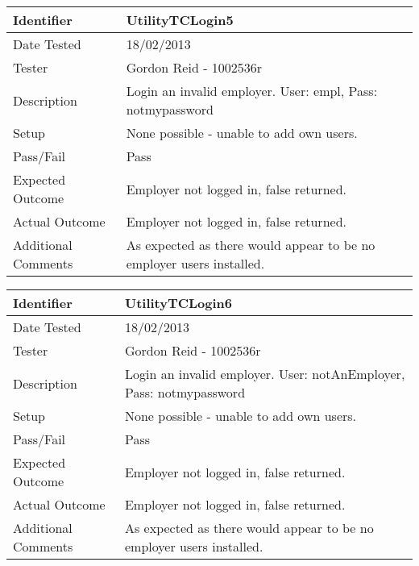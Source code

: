 \documentclass[11pt]{l3deliverable}
\begin{document}
\vspace{2em}

\begin{tabularx}{\textwidth}{|T|L|}
\hline
Identifier & UtilityTCLogin5\\
\hline
Date Tested & 18/02/2013\\
\hline
Tester & Gordon Reid - 1002536r\\
\hline
Description & Login an invalid employer. User: empl, Pass: notmypassword\\
\hline
Setup & None possible - unable to add own users.\\
\hline
Pass/Fail & Pass\\
\hline
Expected Outcome & Employer not logged in, false returned.\\
\hline
Actual Outcome & Employer not logged in, false returned.\\
\hline
Additional Comments & As expected as there would appear to be no employer users 
installed.\\
\hline
\end{tabularx}

\vspace{2em}

\begin{tabularx}{\textwidth}{|T|L|}
\hline
Identifier & UtilityTCLogin6\\
\hline
Date Tested & 18/02/2013\\
\hline
Tester & Gordon Reid - 1002536r\\
\hline
Description & Login an invalid employer. User: notAnEmployer, Pass: 
notmypassword\\
\hline
Setup & None possible - unable to add own users.\\
\hline
Pass/Fail & Pass\\
\hline
Expected Outcome & Employer not logged in, false returned.\\
\hline
Actual Outcome & Employer not logged in, false returned.\\
\hline
Additional Comments & As expected as there would appear to be no employer users 
installed.\\
\hline
\end{tabularx}

\vspace{2em}
\end{document}
